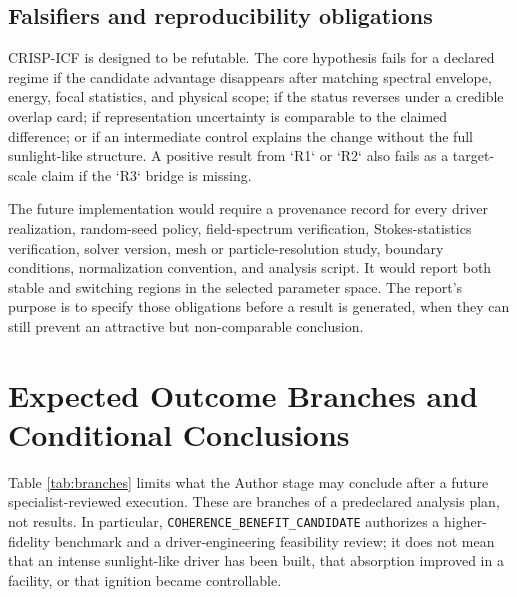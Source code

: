 \documentclass[conference]{../../../../Conference-LaTeX-template_10-17-19/IEEEtran}
\begin{document}
\subsection{Falsifiers and reproducibility obligations}
CRISP-ICF is designed to be refutable. The core hypothesis fails for a declared regime if the candidate advantage disappears after matching spectral envelope, energy, focal statistics, and physical scope; if the status reverses under a credible overlap card; if representation uncertainty is comparable to the claimed difference; or if an intermediate control explains the change without the full sunlight-like structure. A positive result from `R1` or `R2` also fails as a target-scale claim if the `R3` bridge is missing.

The future implementation would require a provenance record for every driver realization, random-seed policy, field-spectrum verification, Stokes-statistics verification, solver version, mesh or particle-resolution study, boundary conditions, normalization convention, and analysis script. It would report both stable and switching regions in the selected parameter space. The report's purpose is to specify those obligations before a result is generated, when they can still prevent an attractive but non-comparable conclusion.

\section{Expected Outcome Branches and Conditional Conclusions}
Table \ref{tab:branches} limits what the Author stage may conclude after a future specialist-reviewed execution. These are branches of a predeclared analysis plan, not results. In particular, \texttt{COHERENCE\_BENEFIT\_CANDIDATE} authorizes a higher-fidelity benchmark and a driver-engineering feasibility review; it does not mean that an intense sunlight-like driver has been built, that absorption improved in a facility, or that ignition became controllable.
\end{document}

